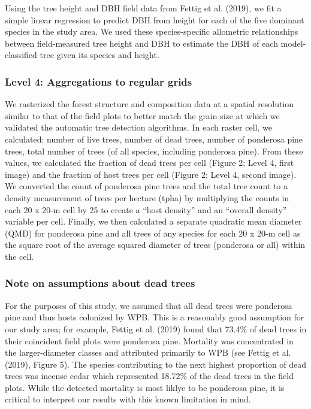 \documentclass[]{article}
\begin{document}
Using the tree height and DBH field data from Fettig et al. (2019), we
fit a simple linear regression to predict DBH from height for each of
the five dominant species in the study area. We used these
species-specific allometric relationships between field-measured tree
height and DBH to estimate the DBH of each model-classified tree given
its species and height.

\hypertarget{level-4-aggregations-to-regular-grids}{%
\subsubsection{Level 4: Aggregations to regular
grids}\label{level-4-aggregations-to-regular-grids}}

We rasterized the forest structure and composition data at a spatial
resolution similar to that of the field plots to better match the grain
size at which we validated the automatic tree detection algorithms. In
each raster cell, we calculated: number of live trees, number of dead
trees, number of ponderosa pine trees, total number of trees (of all
species, including ponderosa pine). From these values, we calculated the
fraction of dead trees per cell (Figure 2; Level 4, first image) and the
fraction of host trees per cell (Figure 2; Level 4, second image). We
converted the count of ponderosa pine trees and the total tree count to
a density measurement of trees per hectare (tpha) by multiplying the
counts in each 20 x 20-m cell by 25 to create a ``host density'' and an
``overall density'' variable per cell. Finally, we then calculated a
separate quadratic mean diameter (QMD) for ponderosa pine and all trees
of any species for each 20 x 20-m cell as the square root of the average
squared diameter of trees (ponderosa or all) within the cell.

\hypertarget{note-on-assumptions-about-dead-trees}{%
\subsubsection{Note on assumptions about dead
trees}\label{note-on-assumptions-about-dead-trees}}

For the purposes of this study, we assumed that all dead trees were
ponderosa pine and thus hosts colonized by WPB. This is a reasonably
good assumption for our study area; for example, Fettig et al. (2019)
found that 73.4\% of dead trees in their coincident field plots were
ponderosa pine. Mortality was concentrated in the larger-diameter
classes and attributed primarily to WPB (see Fettig et al. (2019),
Figure 5). The species contributing to the next highest proportion of
dead trees was incense cedar which represented 18.72\% of the dead trees
in the field plots. While the detected mortality is most liklye to be
ponderosa pine, it is critical to interpret our results with this known
limitation in mind.
\end{document}
